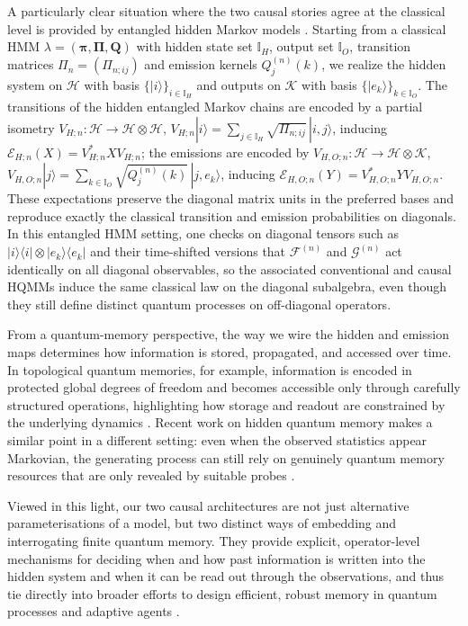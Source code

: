 \documentclass[11pt, reco]{article}
\begin{document}
A particularly clear situation where the two causal stories agree at the classical level is provided by entangled hidden Markov models \cite{SS23}. Starting from a classical HMM \(\lambda=(\boldsymbol{\pi},\mathbf{\Pi},\mathbf{Q})\) with hidden state set \(\mathbb{I}_H\), output set \(\mathbb{I}_O\), transition matrices \(\Pi_n=(\Pi_{n;ij})\) and emission kernels \(Q^{(n)}_j(k)\), we realize the hidden system on \(\mathcal{H}\) with basis \(\{|i\rangle\}_{i\in\mathbb{I}_H}\) and outputs on \(\mathcal{K}\) with basis \(\{|e_k\rangle\}_{k\in\mathbb{I}_O}\). The   transitions of the hidden entangled Markov chains \cite{AccFid05, AccMaOhy06} are encoded by a partial isometry \(V_{H;n}:\mathcal{H}\to\mathcal{H}\otimes\mathcal{H}\), \(V_{H;n}|i\rangle=\sum_{j\in\mathbb{I}_H}\sqrt{\Pi_{n;ij}}\,|i,j\rangle\), inducing \(\mathcal{E}_{H;n}(X)=V_{H;n}^{*}X V_{H;n}\); the emissions are encoded by \(V_{H,O;n}:\mathcal{H}\to\mathcal{H}\otimes\mathcal{K}\), \(V_{H,O;n}|j\rangle=\sum_{k\in\mathbb{I}_O}\sqrt{Q^{(n)}_j(k)}\,|j,e_k\rangle\), inducing \(\mathcal{E}_{H,O;n}(Y)=V_{H,O;n}^{*}Y V_{H,O;n}\). These expectations preserve the diagonal matrix units in the preferred bases and reproduce exactly the classical transition and emission probabilities on diagonals. In this entangled HMM setting, one checks on diagonal tensors such as \(|i\rangle\langle i|\otimes|e_k\rangle\langle e_k|\) and their time-shifted versions that \(\mathcal{F}^{(n)}\) and \(\mathcal{G}^{(n)}\) act identically on all diagonal observables, so the associated conventional and causal HQMMs induce the same classical law on the diagonal subalgebra, even though they still define distinct quantum processes on off-diagonal operators.

From a quantum-memory perspective, the way we wire the hidden and emission maps determines how information is stored, propagated, and accessed over time. In topological quantum memories, for example, information is encoded in protected global degrees of freedom and becomes accessible only through carefully structured operations, highlighting how storage and readout are constrained by the underlying dynamics \cite{DenisKit02,FLW24}. Recent work on hidden quantum memory makes a similar point in a different setting: even when the observed statistics appear Markovian, the generating process can still rely on genuinely quantum memory resources that are only revealed by suitable probes \cite{TaElM,Elliot21}.

Viewed in this light, our two causal architectures are not just alternative parameterisations of a model, but two distinct ways of embedding and interrogating finite quantum memory. They provide explicit, operator-level mechanisms for deciding when and how past information is written into the hidden system and when it can be read out through the observations, and thus tie directly into broader efforts to design efficient, robust memory in quantum processes and adaptive agents \cite{Elliott22,SE26,ZBB25}.
\end{document}
